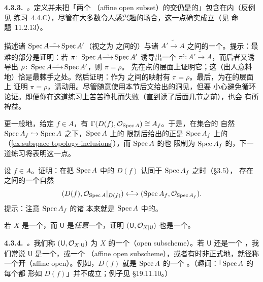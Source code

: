 \textbf{4.3.3.}\ \emph{\trhCaveat{}。}\quad 定义并未把「两个\textbf{\trAffine%
\trOpenSubset}（affine open subset）的交仍是\trAffine{}的」包含在内（反例见%
\mbox{练习~4.4.C}），尽管在大多数令人感兴趣的场合，这一点确实成立（见%
\mbox{命题~11.2.13}）。

\begin{exercise}\label{ex:scheme-isos-ring-isos}
描述诸\trIsomorphism{} $\operatorname{Spec} A\tilde{\longrightarrow}\operatorname{Spec} A'$（视之为%
\trRingedSpace{}之间的\trIsomorphism）与诸\trRing{}\trIsomorphism{}
$A'\tilde{\longrightarrow}A$ 之间的一个\trBijection。提示：最难的部分是证明：若%
\trIsomorphism{} $\pi\colon\operatorname{Spec} A\tilde{\longrightarrow}\operatorname{Spec} A'$ 诱导出一个%
\trIsomorphism{} $\pi^{\sharp}\colon A'\tilde{\longrightarrow}A$，而后者又诱导出%
\trIsomorphism{} $\rho\colon\operatorname{Spec} A\tilde{\longrightarrow}\operatorname{Spec} A'$，则 $\pi=\rho$。
先在点的层面上证明它；这（出人意料地）恰是最棘手之处。然后证明：作为%
\trTopologicalSpace{}之间的映射有 $\pi=\rho$。最后，为在\trStructureSheaf{}的层面上
证明 $\pi=\rho$，请动用\trDistinguishedBase。尽管随意使用本节后文给出的洞见，但要
小心避免循环论证。即便你在这道练习上苦苦挣扎而失败（直到读了后面几节之前），也会
有所裨益。
\end{exercise}

更一般地，给定 $f\in A$，有 $\Gamma(D(f),\mathcal{O}_{\operatorname{Spec} A})\cong A_f$。于是，在集合的
自然\trInclusionMap{} $\operatorname{Spec} A_f\hookrightarrow\operatorname{Spec} A$ 之下，$\operatorname{Spec} A$ 上的%
\trZariskiTopology{}限制后给出的正是 $\operatorname{Spec} A_f$ 上的\trZariskiTopology
（\cref{ex:subspace-topology-inclusions}），而 $\operatorname{Spec} A$ 的\trStructureSheaf{}也
限制为 $\operatorname{Spec} A_f$ 的\trStructureSheaf，下一道练习将表明这一点。

\begin{exercise}[重要而容易的练习]\label{ex:distinguished-open-ringed-space-iso}
设 $f\in A$。证明：在把 $\operatorname{Spec} A$ 中的 $D(f)$ 认同于 $\operatorname{Spec} A_f$ 之时（\S3.5），
存在\trRingedSpace{}之间的一个自然\trIsomorphism
\[
(D(f),\mathcal{O}_{\operatorname{Spec} A}|_{D(f)})\;\tilde{\longleftrightarrow}\;(\operatorname{Spec} A_f,\mathcal{O}_{\operatorname{Spec} A_f}).
\]
提示：注意 $\operatorname{Spec} A_f$ 的诸\trDistinguishedOpen{}
本来就是 $\operatorname{Spec} A$ 中的\trDistinguishedOpen。
\end{exercise}

\begin{exercise}[容易的练习]\label{ex:open-subset-of-scheme}
若 $X$ 是一个\trScheme，而 $\mathsf{U}$ 是\emph{任意}一个\trOpenSubset，证明
$(\mathsf{U},\mathcal{O}_{X|\mathsf{U}})$ 也是一个\trScheme。
\end{exercise}

\textbf{4.3.4.}\ \emph{\trhDefinition{}。}\quad 我们称 $(\mathsf{U},\mathcal{O}_{X|\mathsf{U}})$
为 $X$ 的一个\textbf{\trOpenSubscheme}（open subscheme）。若 $\mathsf{U}$ 还是一个%
\trAffineScheme，我们常说 $\mathsf{U}$ 是一个\textbf{\trAffine\trOpenSubset}，或一个%
\textbf{\trAffine\trOpenSubscheme}（affine open subscheme），或者有时非正式地，就径称
一个\textbf{\trAffine{}开}（affine open）。例如，$D(f)$ 就是 $\operatorname{Spec} A$ 的一个%
\trAffine\trOpenSubscheme。（趣闻：「$\operatorname{Spec} A$ 的每个\trAffine\trOpenSubscheme{}都
形如 $D(f)$」并不成立；例子见 \S19.11.10。）

